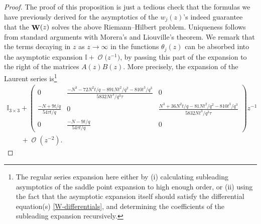 \documentclass[pdftex]{sigma}
\DeclareMathOperator{\OO}{\mathcal{O}}
\DeclareMathOperator{\WW}{{\bf W}}
\numberwithin{equation}{section}
\begin{document}
\begin{proof}
 The proof of this proposition is just a tedious check that the formulas we have previously derived for the asymptotics of the $w_j(z)$'s indeed guarantee that the $\WW(z)$ solves the above Riemann--Hilbert problem. Uniqueness follows from standard arguments with Morera's and Liouville's theorem. We remark that the terms decaying in $z$ as $z\to \infty$ in the functions $\theta_j(z)$ can be absorbed into the asymptotic expansion $\mathbb{I} + \OO\bigl(z^{-1}\bigr)$, by passing this part of the expansion to the right of the matrices $A(z) B(z)$. More precisely, the expansion of the Laurent series is\footnote{The regular series expansion here either by (i) calculating subleading asymptotics of the saddle point expansion to high enough order, or (ii) using the fact that the asymptotic expansion itself should satisfy the differential equation(s) \eqref{W-differentials}, and determining the coefficients
 of the subleading expansion recursively.}
 \begin{gather*}
 \mathbb{I}_{3\times 3} +
 \begin{pmatrix}
 0 & \frac{-N^3 - 72N^2t/q - 891 N t^2/q^2 - 810 t^3/q^3}{5832 N t^3/q^3\tau} & 0\\
			\frac{-N+9t/q}{54\tau t/q} & 0 & \frac{N^3 + 36 N^2 t/q - 81 N t^2/q^2 - 810 t^3/q^3}{5832 N t^3/q^3\tau}\\
			0 & \frac{-N-9t/q}{54\tau t/q} & 0
 \end{pmatrix}z^{-1}\\
 \qquad{} + \OO(z^{-2}).
\tag*{\qed}
\end{gather*}
\renewcommand{\qed}{}
\end{proof}
\end{document}
